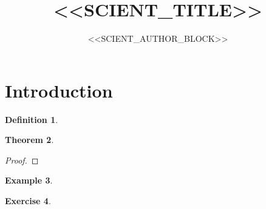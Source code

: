 \documentclass[11pt,a4paper]{article}
\title{<<SCIENT_TITLE>>}
\author{<<SCIENT_AUTHOR_BLOCK>>}
\date{}
\newtheorem{theorem}{Theorem}[section]
\theoremstyle{definition}
\newtheorem{definition}[theorem]{Definition}
\newtheorem{example}[theorem]{Example}
\newtheorem{exercise}[theorem]{Exercise}
\theoremstyle{remark}
\begin{document}
\maketitle

\tableofcontents

\section{Introduction}
\par

\begin{definition}
\end{definition}

\begin{theorem}
\end{theorem}

\begin{proof}
\end{proof}

\begin{example}
\end{example}

\begin{exercise}
\end{exercise}



\end{document}
